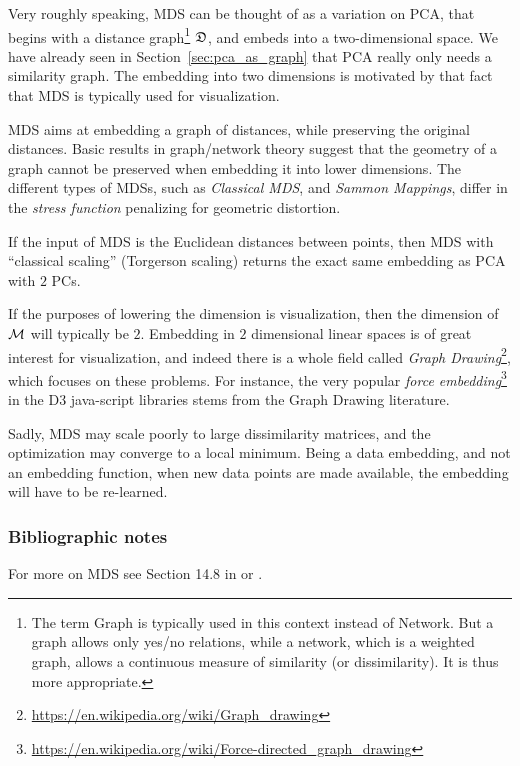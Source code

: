 \documentclass[12pt,a4paper]{article}
\begin{document}
Very roughly speaking, MDS can be thought of as a variation on PCA, that begins with a distance graph\footnote{The term Graph is typically used in this context instead of Network. But a graph allows only yes/no relations, while a network, which is a weighted graph, allows a continuous measure of similarity (or dissimilarity). It is thus more appropriate.} $\mathfrak{D}$, and embeds into a two-dimensional space.
We have already seen in Section~\ref{sec:pca_as_graph} that PCA really only needs a similarity graph. 
The embedding into two dimensions is motivated by that fact that MDS is typically used for visualization. 

MDS aims at embedding a graph of distances, while preserving the original distances.
Basic results in graph/network theory \citep[e.g.][]{graham1988isometric} suggest that the geometry of a graph cannot be preserved when embedding it into lower dimensions. 
The different types of MDSs, such as \emph{Classical MDS}, and \emph{Sammon Mappings}, differ in the \emph{stress function} penalizing for geometric distortion.

\begin{remark}
	If the input of MDS is the Euclidean distances between points, then MDS with ``classical scaling'' (\aka Torgerson scaling) returns the exact same embedding as PCA with $2$ PCs.
\end{remark}


\begin{remark}
	If the purposes of lowering the dimension is visualization, then the dimension of $\mathcal{M}$ will typically be $2$. 
	Embedding in $2$ dimensional linear spaces is of great interest for visualization, and indeed there is a whole field called \emph{Graph Drawing}\footnote{\url{https://en.wikipedia.org/wiki/Graph_drawing}}, which focuses on these problems.
	For instance, the very popular \emph{force embedding}\footnote{\url{https://en.wikipedia.org/wiki/Force-directed_graph_drawing}} in the D3 java-script libraries stems from the Graph Drawing literature. 
\end{remark}


Sadly, MDS may scale poorly to large dissimilarity matrices, and the optimization may converge to a local minimum.
Being a data embedding, and not an embedding function, when new data points are made available, the embedding will have to be re-learned.

\subsubsection{Bibliographic notes}
For more on MDS see Section 14.8 in \cite{friedman2001elements} or \cite{borg_modern_2005}.
\end{document}
